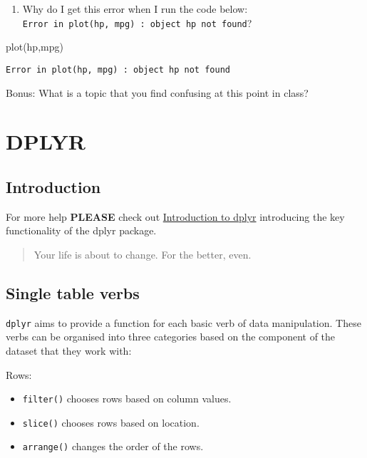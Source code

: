 \documentclass[
]{book}
\newenvironment{Shaded}{\begin{snugshade}}{\end{snugshade}}
\newcommand{\FunctionTok}[1]{\textcolor[rgb]{0.00,0.00,0.00}{#1}}
\newcommand{\NormalTok}[1]{#1}
\providecommand{\tightlist}{%
  \setlength{\itemsep}{0pt}\setlength{\parskip}{0pt}}
\begin{document}
\begin{enumerate}
\def\labelenumi{\arabic{enumi}.}
\setcounter{enumi}{5}
\tightlist
\item
  Why do I get this error when I run the code below: \texttt{Error\ in\ plot(hp,\ mpg)\ :\ object\ \textquotesingle{}hp\textquotesingle{}\ not\ found}?
\end{enumerate}

\begin{Shaded}
\begin{Highlighting}[]
\FunctionTok{plot}\NormalTok{(hp,mpg)}
\end{Highlighting}
\end{Shaded}

\texttt{Error\ in\ plot(hp,\ mpg)\ :\ object\ \textquotesingle{}hp\textquotesingle{}\ not\ found}

Bonus: What is a topic that you find confusing at this point in class?

\hypertarget{dplyr}{%
\chapter{DPLYR}\label{dplyr}}

\hypertarget{introduction-4}{%
\section{Introduction}\label{introduction-4}}

For more help \textbf{PLEASE} check out \href{https://dplyr.tidyverse.org/articles/dplyr.html}{Introduction to dplyr} introducing the key functionality of the dplyr package.

\begin{quote}
Your life is about to change. For the better, even.
\end{quote}

\hypertarget{single-table-verbs}{%
\section{Single table verbs}\label{single-table-verbs}}

\texttt{dplyr} aims to provide a function for each basic verb of data manipulation. These verbs can be organised into three categories based on the component of the dataset that they work with:

Rows:

\begin{itemize}
\tightlist
\item
  \texttt{filter()} chooses rows based on column values.
\item
  \texttt{slice()} chooses rows based on location.
\item
  \texttt{arrange()} changes the order of the rows.
\end{itemize}
\end{document}
